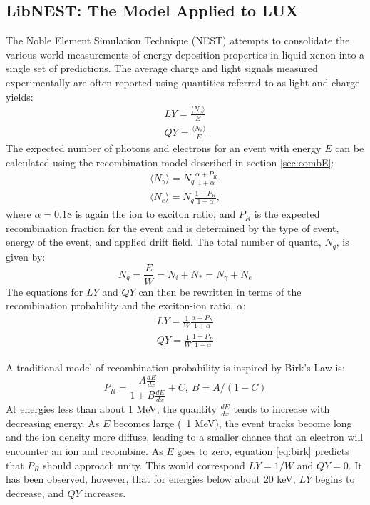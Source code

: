 \subsection{LibNEST: The Model Applied to LUX}\label{sec:libnest}
The Noble Element Simulation Technique (NEST) attempts to consolidate the various world measurements of energy deposition properties in liquid xenon into a single set of predictions\cite{nest1,nest2,lenardo}. The average charge and light signals measured experimentally are often reported using quantities referred to as light and charge yields:
\begin{equation}
\begin{split}
LY=\frac{\langle N_{\gamma}\rangle}{E}\\[1em]
QY=\frac{\langle N_e\rangle}{E}
\end{split}
\end{equation}
The expected number of photons and electrons for an event with energy $E$ can be calculated using the recombination model described in section \ref{sec:combE}:
\begin{equation}
\begin{split}
\langle N_{\gamma} \rangle=N_q\frac{\alpha +P_R}{1+\alpha}\\[1em]
\langle N_{e} \rangle=N_q\frac{1-P_R}{1+\alpha},
\end{split}
\end{equation}
where $\alpha=0.18$ is again the ion to exciton ratio, and $P_R$ is the expected recombination fraction for the event and is determined by the type of event, energy of the event, and applied drift field. The total number of quanta, $N_q$, is given by:
\begin{equation}
N_q=\frac{E}{W}=N_{i}+N_{*}=N_{\gamma}+N_{e}
\end{equation}
The equations for $LY$ and $QY$ can then be rewritten in terms of the recombination probability and the exciton-ion ratio, $\alpha$:
\begin{equation}
\begin{split}
LY=\frac{1}{W}\frac{\alpha +P_R}{1+\alpha}\\[1em]
QY=\frac{1}{W}\frac{1-P_R}{1+\alpha}
\end{split}
\end{equation}

A traditional model of recombination probability is inspired by Birk's Law is\cite{nest1}:
\begin{equation}\label{eq:birk}
P_R=\frac{A\frac{dE}{dx}}{1+B\frac{dE}{dx}}+C , \ B=A/(1-C)
\end{equation}
At energies less than about 1 MeV, the quantity $\frac{dE}{dx}$ tends to increase with decreasing energy. As $E$ becomes large (~1 MeV), the event tracks become long and the ion density more diffuse, leading to a smaller chance that an electron will encounter an ion and recombine. As $E$ goes to zero, equation \ref{eq:birk} predicts that $P_R$ should approach unity. This would correspond $LY=1/W$ and $QY=0$. It has been observed, however, that for energies below about 20 keV, $LY$ begins to decrease, and $QY$ increases. 


